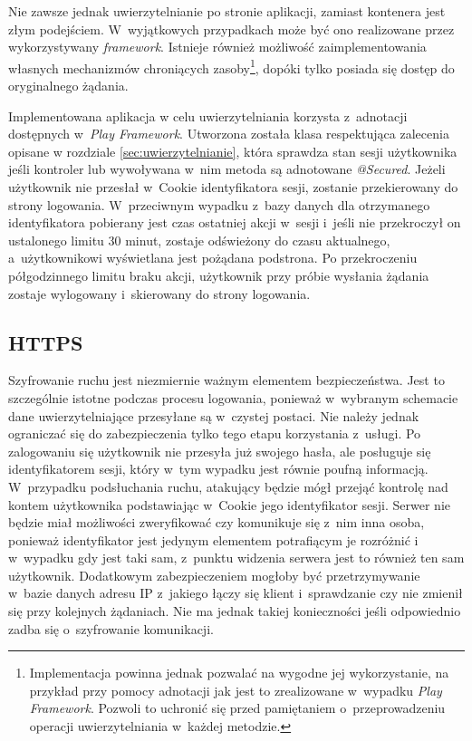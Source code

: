 \documentclass[11pt]{aghdpl}
\begin{document}
Nie zawsze jednak uwierzytelnianie po stronie aplikacji, zamiast kontenera jest złym podejściem. W~wyjątkowych przypadkach może być ono realizowane przez wykorzystywany \emph{framework}. Istnieje również możliwość zaimplementowania własnych mechanizmów chroniących zasoby\footnote{Implementacja powinna jednak pozwalać na wygodne jej wykorzystanie, na przykład przy pomocy adnotacji jak jest to zrealizowane w~wypadku \emph{Play Framework}. Pozwoli to uchronić się przed pamiętaniem o~przeprowadzeniu operacji uwierzytelniania w~każdej metodzie.}, dopóki tylko posiada się dostęp do oryginalnego żądania.

Implementowana aplikacja w celu uwierzytelniania korzysta z~adnotacji dostępnych w~\emph{Play Framework}. Utworzona została klasa respektująca zalecenia opisane w rozdziale \ref{sec:uwierzytelnianie}, która sprawdza stan sesji użytkownika jeśli kontroler lub wywoływana w~nim metoda są adnotowane \emph{@Secured}. Jeżeli użytkownik nie przesłał w~Cookie identyfikatora sesji, zostanie przekierowany do strony logowania. W~przeciwnym wypadku z~bazy danych dla otrzymanego identyfikatora pobierany jest czas ostatniej akcji w~sesji i~jeśli nie przekroczył on ustalonego limitu 30 minut, zostaje odświeżony do czasu aktualnego, a~użytkownikowi wyświetlana jest pożądana podstrona. Po przekroczeniu półgodzinnego limitu braku akcji, użytkownik przy próbie wysłania żądania zostaje wylogowany i~skierowany do strony logowania.
 
\subsection{HTTPS}
\label{sec:https}

Szyfrowanie ruchu jest niezmiernie ważnym elementem bezpieczeństwa. Jest to szczególnie istotne podczas procesu logowania, ponieważ w~wybranym schemacie dane uwierzytelniające przesyłane są w~czystej postaci. Nie należy jednak ograniczać się do zabezpieczenia tylko tego etapu korzystania z~usługi. Po zalogowaniu się użytkownik nie przesyła już swojego hasła, ale posługuje się identyfikatorem sesji, który w~tym wypadku jest równie poufną informacją. W~przypadku podsłuchania ruchu, atakujący będzie mógł przejąć kontrolę nad kontem użytkownika podstawiając w~Cookie jego identyfikator sesji. Serwer nie będzie miał możliwości zweryfikować czy komunikuje się z~nim inna osoba, ponieważ identyfikator jest jedynym elementem potrafiącym je rozróżnić i w~wypadku gdy jest taki sam, z~punktu widzenia serwera jest to również ten sam użytkownik. Dodatkowym zabezpieczeniem mogłoby być przetrzymywanie w~bazie danych adresu IP z~jakiego łączy się klient i~sprawdzanie czy nie zmienił się przy kolejnych żądaniach. Nie ma jednak takiej konieczności jeśli odpowiednio zadba się o~szyfrowanie komunikacji. 
\end{document}
